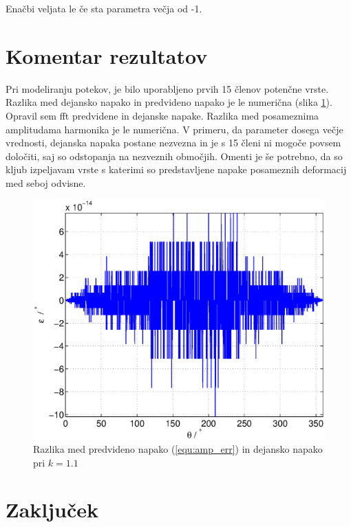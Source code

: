 \documentclass[a4paper]{article}
\begin{document}
Enačbi veljata le če sta parametra večja od -1.


\section{Komentar rezultatov}

Pri modeliranju potekov, je bilo uporabljeno prvih 15 členov potenčne vrste. Razlika med dejansko napako in predvideno napako je le numerična (slika \ref{fig:razlika}). Opravil sem fft predvidene in dejanske napake. Razlika med posameznima amplitudama harmonika je le numerična. V primeru, da parameter dosega večje vrednosti, dejanska napaka postane nezvezna in je s 15 členi ni mogoče povsem določiti, saj so odstopanja na nezveznih območjih. Omenti je še potrebno, da so kljub izpeljavam vrste s katerimi so predstavljene napake posameznih deformacij med seboj odvisne.

\begin{figure}[!htb]
	\begin{center}
		\includegraphics[width=\linewidth]{./Slike/razlika_amp.eps}
		\caption{Razlika med predvideno napako (\ref{equ:amp_err}) in dejansko napako pri $k=1.1$} \label{fig:razlika}
	\end{center}
\end{figure}




\section{Zaključek}
\end{document}
